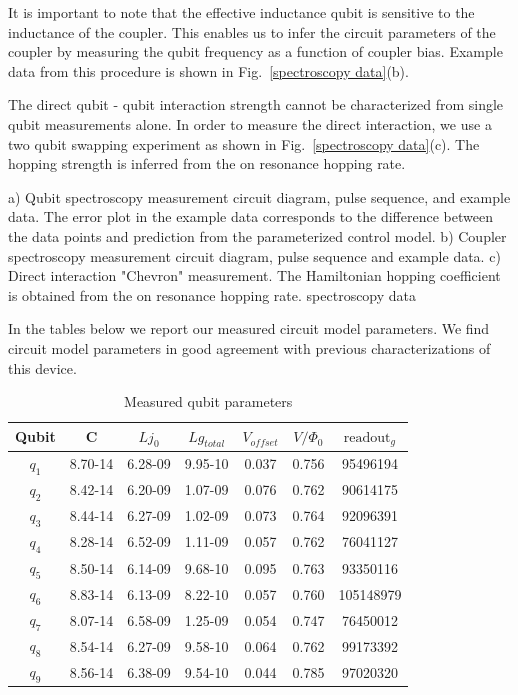 It is important to note that the effective inductance qubit is sensitive to the inductance of the coupler.
This enables us to infer the circuit parameters of the coupler by measuring the qubit frequency as a function of coupler bias.
Example data from this procedure is shown in Fig.~\ref{spectroscopy data}(b).

The direct qubit - qubit interaction strength cannot be characterized from single qubit measurements alone.
In order to measure the direct interaction, we use a two qubit swapping experiment as shown in Fig.~\ref{spectroscopy data}(c).
The hopping strength is inferred from the on resonance hopping rate.

{
a) Qubit spectroscopy measurement circuit diagram, pulse sequence, and example data.
The error plot in the example data corresponds to the difference between the data points and prediction from the parameterized control model.
b) Coupler spectroscopy measurement circuit diagram, pulse sequence and example data.
c) Direct interaction "Chevron" measurement.  The Hamiltonian hopping coefficient is obtained from the on resonance hopping rate.
}
{spectroscopy data}

In the tables below we report our measured circuit model parameters.
We find circuit model parameters in good agreement with previous characterizations of this device.\cite{Neill2018}
\begin{table}
    \caption{Measured qubit parameters}
    \centering
    \begin{tabular}{ c c c c c c c}
        \hline \hline
        Qubit & C & $Lj_{0}$ & $Lg_{total}$ & $V_{offset}$ & $V/ \Phi_{0}$ & $\text{readout}_{g}$ \\
        \hline
        $q_1$ & 8.70-14 & 6.28-09 & 9.95-10 & 0.037 & 0.756 & 95496194  \\
        $q_2$ & 8.42-14 & 6.20-09 & 1.07-09 & 0.076 & 0.762 & 90614175  \\
        $q_3$ & 8.44-14 & 6.27-09 & 1.02-09 & 0.073 & 0.764 & 92096391  \\
        $q_4$ & 8.28-14 & 6.52-09 & 1.11-09 & 0.057 & 0.762 & 76041127  \\
        $q_5$ & 8.50-14 & 6.14-09 & 9.68-10 & 0.095 & 0.763 & 93350116  \\
        $q_6$ & 8.83-14 & 6.13-09 & 8.22-10 & 0.057 & 0.760 & 105148979 \\
        $q_7$ & 8.07-14 & 6.58-09 & 1.25-09 & 0.054 & 0.747 & 76450012  \\
        $q_8$ & 8.54-14 & 6.27-09 & 9.58-10 & 0.064 & 0.762 & 99173392  \\
        $q_9$ & 8.56-14 & 6.38-09 & 9.54-10 & 0.044 & 0.785 & 97020320  \\
        \hline
    \end{tabular}
    \label{table:Qubit Parameters}
\end{table}

